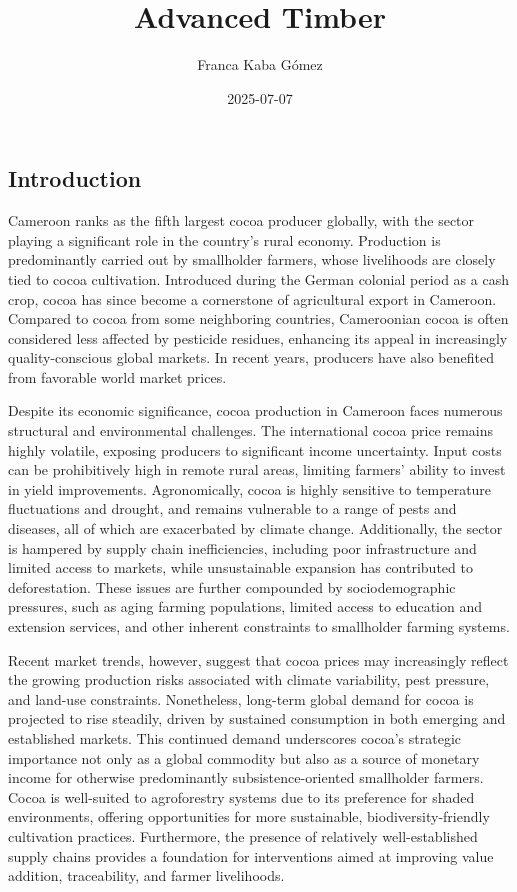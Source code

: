 \documentclass[
]{article}
\title{Advanced Timber}
\author{Franca Kaba Gómez}
\date{2025-07-07}
\begin{document}
\maketitle

\hypertarget{introduction}{%
\subsection{Introduction}\label{introduction}}

Cameroon ranks as the fifth largest cocoa producer globally, with the
sector playing a significant role in the country's rural economy.
Production is predominantly carried out by smallholder farmers, whose
livelihoods are closely tied to cocoa cultivation. Introduced during the
German colonial period as a cash crop, cocoa has since become a
cornerstone of agricultural export in Cameroon. Compared to cocoa from
some neighboring countries, Cameroonian cocoa is often considered less
affected by pesticide residues, enhancing its appeal in increasingly
quality-conscious global markets. In recent years, producers have also
benefited from favorable world market prices.

Despite its economic significance, cocoa production in Cameroon faces
numerous structural and environmental challenges. The international
cocoa price remains highly volatile, exposing producers to significant
income uncertainty. Input costs can be prohibitively high in remote
rural areas, limiting farmers' ability to invest in yield improvements.
Agronomically, cocoa is highly sensitive to temperature fluctuations and
drought, and remains vulnerable to a range of pests and diseases, all of
which are exacerbated by climate change. Additionally, the sector is
hampered by supply chain inefficiencies, including poor infrastructure
and limited access to markets, while unsustainable expansion has
contributed to deforestation. These issues are further compounded by
sociodemographic pressures, such as aging farming populations, limited
access to education and extension services, and other inherent
constraints to smallholder farming systems.

Recent market trends, however, suggest that cocoa prices may
increasingly reflect the growing production risks associated with
climate variability, pest pressure, and land-use constraints.
Nonetheless, long-term global demand for cocoa is projected to rise
steadily, driven by sustained consumption in both emerging and
established markets. This continued demand underscores cocoa's strategic
importance not only as a global commodity but also as a source of
monetary income for otherwise predominantly subsistence-oriented
smallholder farmers. Cocoa is well-suited to agroforestry systems due to
its preference for shaded environments, offering opportunities for more
sustainable, biodiversity-friendly cultivation practices. Furthermore,
the presence of relatively well-established supply chains provides a
foundation for interventions aimed at improving value addition,
traceability, and farmer livelihoods.
\end{document}
